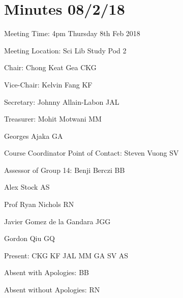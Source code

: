 \section{Minutes 08/2/18}\label{app:8-2}

\noindent Meeting Time: 4pm Thursday 8th Feb 2018

\noindent Meeting Location: Sci Lib Study Pod 2\textbf{}



\noindent \textbf{}

\noindent Chair: Chong Keat Gea CKG

\noindent Vice-Chair: Kelvin Fang KF

\noindent Secretary: Johnny Allain-Labon JAL

\noindent Treasurer: Mohit Motwani MM

\noindent Georges Ajaka GA

\noindent Course Coordinator Point of Contact: Steven Vuong SV

\noindent Assessor of Group 14: Benji Berczi BB

\noindent Alex Stock AS

\noindent Prof Ryan Nichols RN

\noindent Javier Gomez de la Gandara JGG

\noindent Gordon Qiu GQ

\noindent 

\noindent 

\noindent Present: CKG KF JAL MM GA SV AS

\noindent Absent with Apologies: BB

\noindent Absent without Apologies: RN



